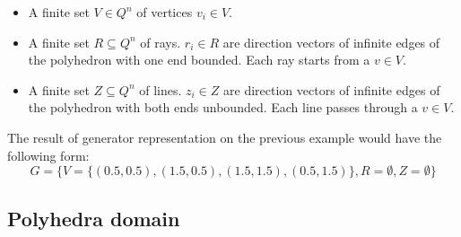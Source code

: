 \begin{itemize}
	\item A finite set $V\in Q^n$ of vertices $v_i \in V$.
	\item A finite set $R \subseteq Q^n$ of rays. $r_i \in R$ are direction vectors of infinite edges of the polyhedron with one end bounded. Each ray starts from a $v \in V$.
	\item  A finite set $Z \subseteq Q^n$ of lines. $z_i \in Z$ are direction vectors of infinite edges of the polyhedron with both ends unbounded. Each line passes through a $v \in V$.
\end{itemize}
The result of generator representation on the previous example would have the following form: 
\begin{equation}
	G = \{ V = \{(0.5,0.5),(1.5,0.5),(1.5,1.5),(0.5,1.5)\}, R = \emptyset, Z = \emptyset \}
\end{equation}
\subsection{Polyhedra domain}

